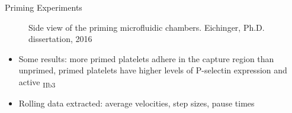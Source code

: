 \documentclass[10pt]{beamer}
\begin{document}
\begin{frame}{Priming Experiments}
  \begin{figure}
    \centering
    \caption{Side view of the priming microfluidic
      chambers. Eichinger, Ph.D. dissertation, 2016}
    \label{fig:flow-chambers}
  \end{figure}

  \begin{itemize}
  \item Some results: more primed platelets adhere in the capture
    region than unprimed, primed platelets have higher levels of
    P-selectin expression and active
    \textalpha\textsubscript{IIb}\textbeta\textsubscript{3} 
  \item Rolling data extracted: average velocities, step sizes, pause times
  \end{itemize}
\end{frame}
\end{document}
